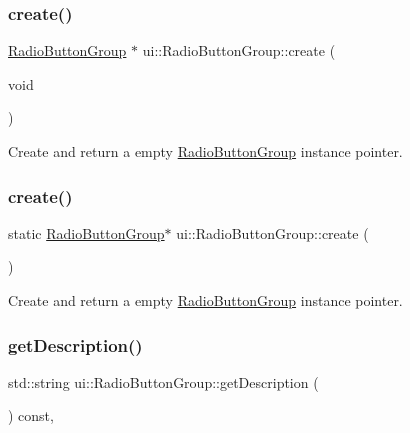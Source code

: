 \subsubsection{\texorpdfstring{create()}{create()}\hspace{0.1cm}{\footnotesize\ttfamily [1/2]}}
{\footnotesize\ttfamily \hyperlink{classui_1_1RadioButtonGroup}{Radio\+Button\+Group} $\ast$ ui\+::\+Radio\+Button\+Group\+::create (\begin{DoxyParamCaption}\item[{void}]{ }\end{DoxyParamCaption})\hspace{0.3cm}{\ttfamily [static]}}

Create and return a empty \hyperlink{classui_1_1RadioButtonGroup}{Radio\+Button\+Group} instance pointer. \mbox{\label{classui_1_1RadioButtonGroup_a2ee178b9fba030c5f02aa5110dfb71b2}} 
\subsubsection{\texorpdfstring{create()}{create()}\hspace{0.1cm}{\footnotesize\ttfamily [2/2]}}
{\footnotesize\ttfamily static \hyperlink{classui_1_1RadioButtonGroup}{Radio\+Button\+Group}$\ast$ ui\+::\+Radio\+Button\+Group\+::create (\begin{DoxyParamCaption}{ }\end{DoxyParamCaption})\hspace{0.3cm}{\ttfamily [static]}}

Create and return a empty \hyperlink{classui_1_1RadioButtonGroup}{Radio\+Button\+Group} instance pointer. \mbox{\label{classui_1_1RadioButtonGroup_adfabb4162d7b0f22d376feab245869a6}} 
\subsubsection{\texorpdfstring{get\+Description()}{getDescription()}\hspace{0.1cm}{\footnotesize\ttfamily [1/2]}}
{\footnotesize\ttfamily std\+::string ui\+::\+Radio\+Button\+Group\+::get\+Description (\begin{DoxyParamCaption}{ }\end{DoxyParamCaption}) const\hspace{0.3cm}{\ttfamily [override]}, {\ttfamily [virtual]}}

